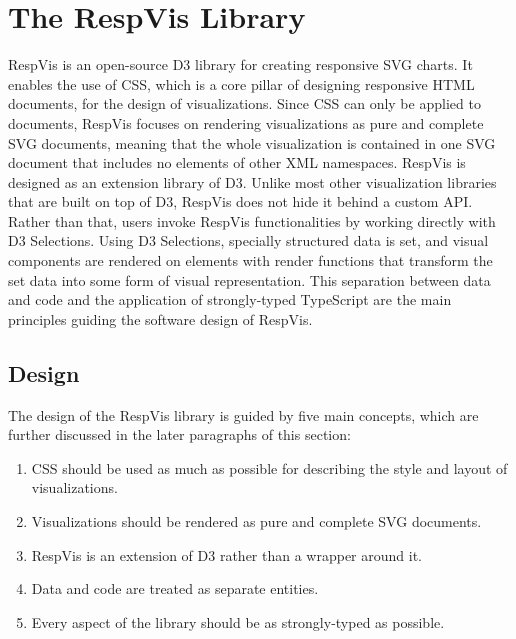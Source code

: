 \chapter{The RespVis Library}
\label{chap:RespVis}

RespVis is an open-source D3 library for creating responsive SVG charts.
It enables the use of CSS, which is a core pillar of designing responsive HTML documents, for the design of visualizations.
Since CSS can only be applied to documents, RespVis focuses on rendering visualizations as pure and complete SVG documents, meaning that the whole visualization is contained in one SVG document that includes no elements of other XML namespaces.
RespVis is designed as an extension library of D3. 
Unlike most other visualization libraries that are built on top of D3, RespVis does not hide it behind a custom API.
Rather than that, users invoke RespVis functionalities by working directly with D3 Selections. 
Using D3 Selections, specially structured data is set, and visual components are rendered on elements with render functions that transform the set data into some form of visual representation.
This separation between data and code and the application of strongly-typed TypeScript are the main principles guiding the software design of RespVis.

\section{Design}

The design of the RespVis library is guided by five main concepts, which are further discussed in the later paragraphs of this section:

\begin{enumerate}
\item CSS should be used as much as possible for describing the style and layout of visualizations.
\item Visualizations should be rendered as pure and complete SVG documents.
\item RespVis is an extension of D3 rather than a wrapper around it.
\item Data and code are treated as separate entities.
\item Every aspect of the library should be as strongly-typed as possible.
\end{enumerate}

